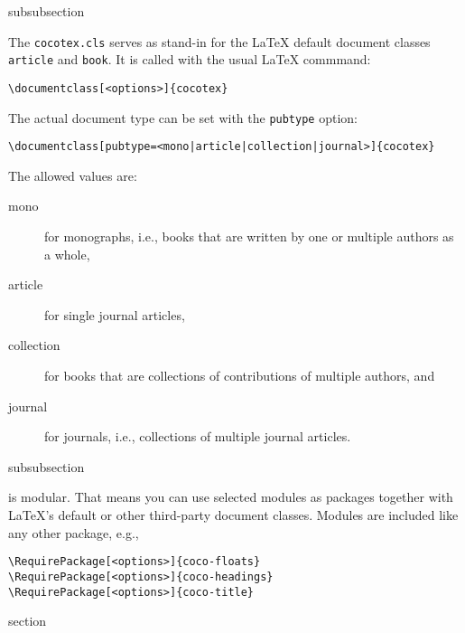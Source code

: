 \begin{heading}{subsubsection}
\end{heading}

The \lstinline{cocotex.cls} serves as stand-in for the {\LaTeX}
default document classes \lstinline{article} and \lstinline{book}. It
is called with the usual {\LaTeX} commmand:
\begin{lstlisting}[style=tex]
\documentclass[<options>]{cocotex}
\end{lstlisting}

The actual document type can be set with the \lstinline{pubtype} option:
\begin{lstlisting}[style=tex]
\documentclass[pubtype=<mono|article|collection|journal>]{cocotex}
\end{lstlisting}
The allowed values are:
\begin{description}
\item[\ttfamily mono] for monographs, i.e., books that are written by one or
  multiple authors as a whole,
\item[\ttfamily article] for single journal articles,
\item[\ttfamily collection] for books that are collections of contributions of
  multiple authors, and
\item[\ttfamily journal] for journals, i.e., collections of multiple journal
  articles.
\end{description}


\begin{heading}[label=sec:modules]{subsubsection}
\end{heading}

{\CoCoTeX} is modular. That means you can use selected modules as
packages together with \LaTeX's default or other third-party document
classes. Modules are included like any other package, e.g.,
\begin{lstlisting}[style=tex]
\RequirePackage[<options>]{coco-floats}
\RequirePackage[<options>]{coco-headings}
\RequirePackage[<options>]{coco-title}
\end{lstlisting}

\begin{heading}{section}
\end{heading}

